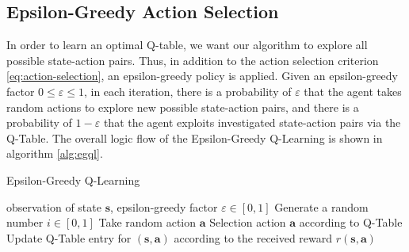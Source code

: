 \documentclass[10pt,a4paper]{article}
\begin{document}
\subsection{Epsilon-Greedy Action Selection}
In order to learn an optimal Q-table, we want our algorithm to explore all possible state-action pairs. Thus, in addition to the action selection criterion \eqref{eq:action-selection},  an epsilon-greedy policy is applied. Given an epsilon-greedy factor $0 \le \varepsilon \le 1$, in each iteration, there is a probability of $\varepsilon$ that the agent takes random actions to explore new possible state-action pairs, and there is a probability of $1 - \varepsilon$ that the agent exploits investigated state-action pairs via the Q-Table. The overall logic flow of the Epsilon-Greedy Q-Learning is shown in algorithm \ref{alg:egql}. 

\begin{algorithm}
\caption{Epsilon-Greedy Q-Learning}\label{alg:egql}
\begin{algorithmic}
\Require observation of state $\boldsymbol{s}$, epsilon-greedy factor $\varepsilon \in [0,1]$
\State Generate a random number $i \in [0,1]$
\State Take random action $\boldsymbol{a}$
\Else
\State Selection action $\boldsymbol{a}$ according to Q-Table 
\EndIf
\State Update Q-Table entry for $(\boldsymbol{s}, \boldsymbol{a})$ according to the received reward $r(\boldsymbol{s}, \boldsymbol{a})$ 
\EndWhile
\end{algorithmic}
\end{algorithm}
\end{document}
